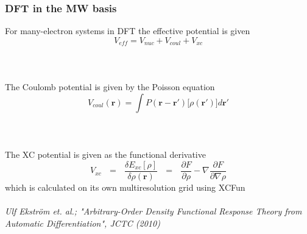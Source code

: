 \documentclass[mathserif]{beamer}
\begin{document}
\begin{frame}
    \frametitle{DFT in the MW basis}
    For many-electron systems in DFT the effective potential is given
    \begin{equation}
	\nonumber
	V_{eff} = V_{nuc} + V_{coul} + V_{xc}
    \end{equation}
    \ \\
    \ \\
    \ \\
    \pause
    The Coulomb potential is given by the Poisson equation 
    \begin{equation}
	\nonumber
	V_{coul}(\boldsymbol{r}) = 
	\int
	P(\boldsymbol{r} - \boldsymbol{r}') \Big[ \rho(\boldsymbol{r}')\Big] d\boldsymbol{r}'
    \end{equation}
    \ \\
    \ \\
    \ \\
    \pause
    The XC potential is given as the functional derivative
    \begin{equation}
	\nonumber
	V_{xc} \ \ \ = \ \ \ \frac{\delta E_{xc}[\rho]}{\delta \rho(\boldsymbol{r})}
	       \ \ \ = \ \ \ \frac{\partial F}{\partial \rho} - 
		    \nabla \frac{\partial F}{\partial \nabla \rho}
    \end{equation}
    which is calculated on its own multiresolution grid using XCFun\\
    \ \\
    \tiny
    \it{Ulf Ekstr\"{o}m et. al.; "Arbitrary-Order Density Functional Response Theory from 
	Automatic Differentiation", JCTC (2010)}
\end{frame}
\end{document}
